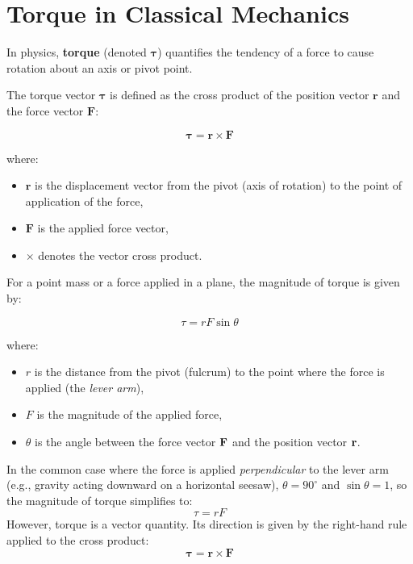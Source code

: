 \documentclass{article}
\begin{document}
\section{Torque in Classical Mechanics}

In physics, \textbf{torque} (denoted $\boldsymbol{\tau}$) quantifies the tendency of a force to cause rotation about an axis or pivot point. 

The torque vector $\boldsymbol{\tau}$ is defined as the cross product of the position vector $\mathbf{r}$ and the force vector $\mathbf{F}$:

\[
\boldsymbol{\tau} = \mathbf{r} \times \mathbf{F}
\]

where:
\begin{itemize}
\item $\mathbf{r}$ is the displacement vector from the pivot (axis of rotation) to the point of application of the force,
    \item $\mathbf{F}$ is the applied force vector,
    \item $\times$ denotes the vector cross product.
\end{itemize}

For a point mass or a force applied in a plane, the magnitude of torque is given by:

\[
\tau = r F \sin\theta
\]

where:
\begin{itemize}
\item $r$ is the distance from the pivot (fulcrum) to the point where the force is applied (the \textit{lever arm}),
    \item $F$ is the magnitude of the applied force,
    \item $\theta$ is the angle between the force vector $\vb{F}$ and the position vector $\vb{r}$.
\end{itemize}


In the common case where the force is applied \textit{perpendicular} to the lever arm (e.g., gravity acting downward on a horizontal seesaw), $\theta = 90^\circ$ and $\sin\theta = 1$, so the magnitude of torque simplifies to:
\[
\tau = r F
\]
However, torque is a vector quantity. Its direction is given by the right-hand rule applied to the cross product:
\[
\boldsymbol{\tau} = \mathbf{r} \times \mathbf{F}
\]
\end{document}
